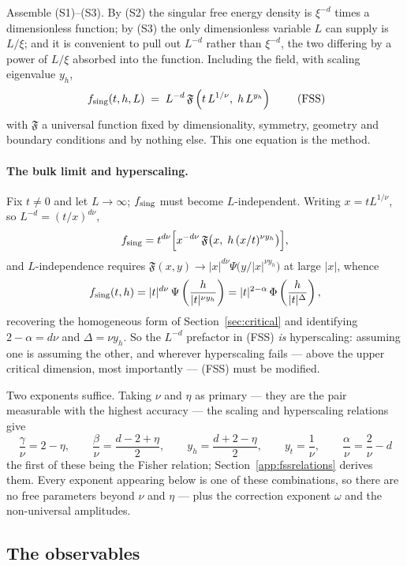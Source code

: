 \documentclass[10pt,a4paper]{article}
\theoremstyle{remark}
\begin{document}
Assemble (S1)--(S3). By (S2) the singular free energy density is $\xi^{-d}$ times
a dimensionless function; by (S3) the only dimensionless variable $L$ can supply
is $L/\xi$; and it is convenient to pull out $L^{-d}$ rather than $\xi^{-d}$, the
two differing by a power of $L/\xi$ absorbed into the function. Including the
field, with scaling eigenvalue $y_h$,
\[
\;
f_{\rm sing}(t,h,L)\;=\;L^{-d}\,\mathfrak{F}\left(t\,L^{1/\nu},\;h\,L^{y_h}\right)
\
\tag{FSS}
\]
with $\mathfrak{F}$ a universal function fixed by dimensionality, symmetry,
geometry and boundary conditions and by nothing else. This one equation is the
method.

\paragraph{The bulk limit and hyperscaling.} Fix $t\neq0$ and let $L\to\infty$;
$f_{\rm sing}$ must become $L$-independent. Writing $x=tL^{1/\nu}$, so
$L^{-d}=(t/x)^{d\nu}$,
\[
f_{\rm sing}=t^{d\nu}\Big[x^{-d\nu}\,\mathfrak{F}\big(x,\;h\,(x/t)^{\nu y_h}\big)\Big],
\]
and $L$-independence requires
$\mathfrak{F}(x,y)\to|x|^{d\nu}\Psi\big(y/|x|^{\nu y_h}\big)$ at large $|x|$,
whence
\[
f_{\rm sing}(t,h)=|t|^{d\nu}\,\Psi\left(\frac{h}{|t|^{\nu y_h}}\right)
=|t|^{2-\alpha}\,\Phi\left(\frac{h}{|t|^{\Delta}}\right),
\]
recovering the homogeneous form of Section~\ref{sec:critical} and identifying
$2-\alpha=d\nu$ and $\Delta=\nu y_h$. So the $L^{-d}$ prefactor in (FSS)
\emph{is} hyperscaling: assuming one is assuming the other, and wherever
hyperscaling fails --- above the upper critical dimension, most importantly ---
(FSS) must be modified.

Two exponents suffice. Taking $\nu$ and $\eta$ as primary --- they are the pair
measurable with the highest accuracy --- the scaling and hyperscaling relations
give
\[
\;\frac{\gamma}{\nu}=2-\eta,\qquad
\frac{\beta}{\nu}=\frac{d-2+\eta}{2},\qquad
y_h=\frac{d+2-\eta}{2},\qquad
y_t=\frac{1}{\nu},\qquad
\frac{\alpha}{\nu}=\frac{2}{\nu}-d\
\]
the first of these being the Fisher relation; Section~\ref{app:fssrelations}
derives them. Every exponent appearing below is one of these combinations, so
there are no free parameters beyond $\nu$ and $\eta$ --- plus the correction
exponent $\omega$ and the non-universal amplitudes.

\subsection{The observables}
\label{sec:fss:observables}
\end{document}
